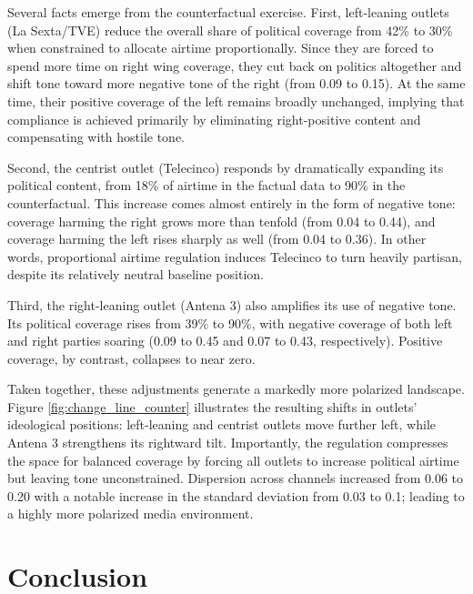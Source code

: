 \documentclass[12pt]{article}
\begin{document}
Several facts emerge from the counterfactual exercise. First, left-leaning outlets (La Sexta/TVE) reduce the overall share of political coverage from 42\% to 30\% when constrained to allocate airtime proportionally. Since they are forced to spend more time on right wing coverage, they cut back on politics altogether and shift tone toward more negative tone of the right (from 0.09 to 0.15). At the same time, their positive coverage of the left remains broadly unchanged, implying that compliance is achieved primarily by eliminating right-positive content and compensating with hostile tone.


Second, the centrist outlet (Telecinco) responds by dramatically expanding its political content, from 18\% of airtime in the factual data to 90\% in the counterfactual. This increase comes almost entirely in the form of negative tone: coverage harming the right grows more than tenfold (from 0.04 to 0.44), and coverage harming the left rises sharply as well (from 0.04 to 0.36). In other words, proportional airtime regulation induces Telecinco to turn heavily partisan, despite its relatively neutral baseline position.

Third, the right-leaning outlet (Antena 3) also amplifies its use of negative tone. Its political coverage rises from 39\% to 90\%, with negative coverage of both left and right parties soaring (0.09 to 0.45 and 0.07 to 0.43, respectively). Positive coverage, by contrast, collapses to near zero.


Taken together, these adjustments generate a markedly more polarized landscape. Figure \ref{fig:change_line_counter} illustrates the resulting shifts in outlets’ ideological positions: left-leaning and centrist outlets move further left, while Antena 3 strengthens its rightward tilt. Importantly, the regulation compresses the space for balanced coverage by forcing all outlets to increase political airtime but leaving tone unconstrained. Dispersion across channels increased from 0.06 to 0.20 with a notable increase in the standard deviation from 0.03 to 0.1; leading to a highly more polarized media environment. 





	
	\section{Conclusion}
	\label{sec:conclusion}
	
\end{document}
